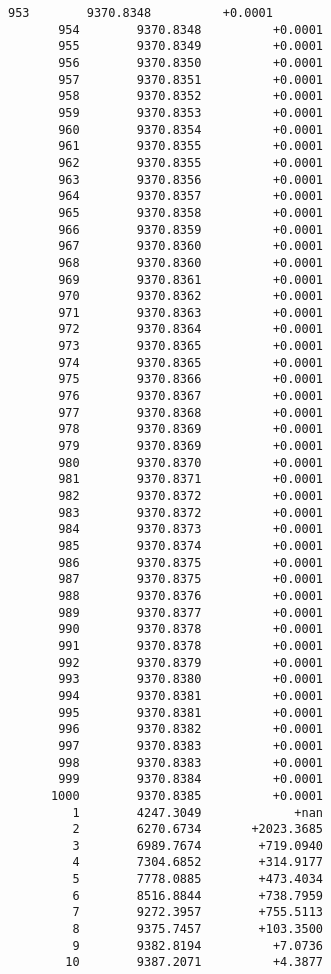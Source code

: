 \documentclass[11pt]{article}
\begin{document}
\begin{Verbatim}[commandchars=\\\{\}]
       953        9370.8348          +0.0001
       954        9370.8348          +0.0001
       955        9370.8349          +0.0001
       956        9370.8350          +0.0001
       957        9370.8351          +0.0001
       958        9370.8352          +0.0001
       959        9370.8353          +0.0001
       960        9370.8354          +0.0001
       961        9370.8355          +0.0001
       962        9370.8355          +0.0001
       963        9370.8356          +0.0001
       964        9370.8357          +0.0001
       965        9370.8358          +0.0001
       966        9370.8359          +0.0001
       967        9370.8360          +0.0001
       968        9370.8360          +0.0001
       969        9370.8361          +0.0001
       970        9370.8362          +0.0001
       971        9370.8363          +0.0001
       972        9370.8364          +0.0001
       973        9370.8365          +0.0001
       974        9370.8365          +0.0001
       975        9370.8366          +0.0001
       976        9370.8367          +0.0001
       977        9370.8368          +0.0001
       978        9370.8369          +0.0001
       979        9370.8369          +0.0001
       980        9370.8370          +0.0001
       981        9370.8371          +0.0001
       982        9370.8372          +0.0001
       983        9370.8372          +0.0001
       984        9370.8373          +0.0001
       985        9370.8374          +0.0001
       986        9370.8375          +0.0001
       987        9370.8375          +0.0001
       988        9370.8376          +0.0001
       989        9370.8377          +0.0001
       990        9370.8378          +0.0001
       991        9370.8378          +0.0001
       992        9370.8379          +0.0001
       993        9370.8380          +0.0001
       994        9370.8381          +0.0001
       995        9370.8381          +0.0001
       996        9370.8382          +0.0001
       997        9370.8383          +0.0001
       998        9370.8383          +0.0001
       999        9370.8384          +0.0001
      1000        9370.8385          +0.0001
         1        4247.3049             +nan
         2        6270.6734       +2023.3685
         3        6989.7674        +719.0940
         4        7304.6852        +314.9177
         5        7778.0885        +473.4034
         6        8516.8844        +738.7959
         7        9272.3957        +755.5113
         8        9375.7457        +103.3500
         9        9382.8194          +7.0736
        10        9387.2071          +4.3877

\end{Verbatim}
\end{document}
